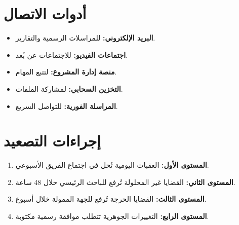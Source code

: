 \documentclass[11pt,a4paper,landscape]{article}
\begin{document}
\section{أدوات الاتصال}
\label{sec:tools}

\begin{itemize}
    \item \textbf{البريد الإلكتروني:} للمراسلات الرسمية والتقارير.
    \item \textbf{اجتماعات الفيديو:}  للاجتماعات عن بُعد.
    \item \textbf{منصة إدارة المشروع:}  لتتبع المهام.
    \item \textbf{التخزين السحابي:}  لمشاركة الملفات.
    \item \textbf{المراسلة الفورية:}  للتواصل السريع.
\end{itemize}

\section{إجراءات التصعيد}
\label{sec:escalation}

\begin{enumerate}
    \item \textbf{المستوى الأول:} العقبات اليومية تُحل في اجتماع الفريق الأسبوعي.
    \item \textbf{المستوى الثاني:} القضايا غير المحلولة تُرفع للباحث الرئيسي خلال 48 ساعة.
    \item \textbf{المستوى الثالث:} القضايا الحرجة تُرفع للجهة الممولة خلال أسبوع.
    \item \textbf{المستوى الرابع:} التغييرات الجوهرية تتطلب موافقة رسمية مكتوبة.
\end{enumerate}
\end{document}
